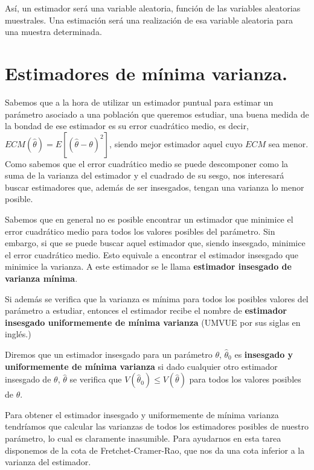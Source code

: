 As\'i, un estimador ser\'a una variable aleatoria, funci\'on de las variables aleatorias muestrales. Una estimaci\'on ser\'a una realizaci\'on de esa variable aleatoria para una muestra determinada.

\section{Estimadores de m\'inima varianza.}

Sabemos que a la hora de utilizar un estimador puntual para estimar un par\'ametro asociado a una poblaci\'on que queremos estudiar, una buena medida de la bondad de ese estimador es su error cuadr\'atico medio, es decir, $ECM(\hat{\theta})=E[(\hat{\theta}-\theta)^2]$, siendo mejor estimador aquel cuyo $ECM$ sea menor. Como sabemos que el error cuadr\'atico medio se puede descomponer como la suma de la varianza del estimador y el cuadrado de su sesgo, nos interesar\'a buscar estimadores que, adem\'as de ser insesgados, tengan una varianza lo menor posible.

Sabemos que en general no es posible encontrar un estimador que minimice el error cuadr\'atico medio para todos los valores posibles del par\'ametro. Sin embargo, si que se puede buscar aquel estimador que, siendo insesgado, minimice el error cuadr\'atico medio. Esto equivale a encontrar el estimador insesgado que minimice la varianza. A este estimador se le llama \textbf{estimador insesgado de varianza m\'inima}.

Si adem\'as se verifica que la varianza es m\'inima para todos los posibles valores del par\'ametro a estudiar, entonces el estimador recibe el nombre de \textbf{estimador insesgado uniformemente de m\'inima varianza} (UMVUE por sus siglas en ingl\'es.)

\begin{definicion}
Diremos que un estimador insesgado para un par\'ametro $\theta$, $\hat{\theta}_0$ es \textbf{insesgado y uniformemente de m\'inima varianza} si dado cualquier otro estimador insesgado de $\theta$, $\hat{\theta}$ se verifica que $V(\hat{\theta}_0)\leq V(\hat{\theta})$ para todos los valores posibles de $\theta$.
\end{definicion}

Para obtener el estimador insesgado y uniformemente de m\'inima varianza tendr\'iamos que calcular las varianzas de todos los estimadores posibles de nuestro par\'ametro, lo cual es claramente inasumible. Para ayudarnos en esta tarea disponemos de la cota de Fretchet-Cramer-Rao, que nos da una cota inferior a la varianza del estimador.


